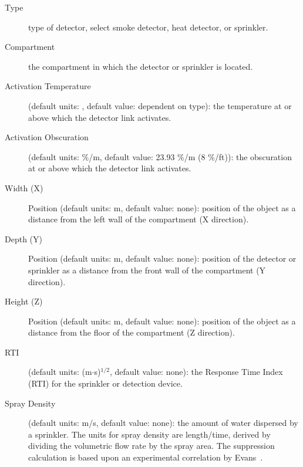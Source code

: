 \begin{description}
\item[Type] type of detector, select smoke detector, heat detector, or sprinkler.

\item[Compartment] the compartment in which the detector or sprinkler is located.

\item[Activation Temperature] (default units: \degc, default value: dependent on type): the temperature at or above which the detector link activates.

\item[Activation Obscuration] (default units: \%/m, default value: 23.93 \%/m (8 \%/ft)): the obscuration at or above which the detector link activates.

\item[Width (X)] Position (default units: m, default value: none): position of the object as a distance from the left wall of the compartment (X direction).

\item[Depth (Y)] Position (default units: m, default value: none): position of the detector or sprinkler as a distance from the front wall of the compartment (Y direction).

\item[Height (Z)] Position (default units: m, default value: none): position of the object as a distance from the floor of the compartment (Z direction).

\item[RTI] (default units: (m$\cdot$s)$^{1/2}$, default value: none): the Response Time Index (RTI) for the sprinkler or detection device.

\item[Spray Density] (default units: m/s, default value: none): the amount of water dispersed by a sprinkler.  The units for spray density are length/time, derived by dividing the volumetric flow rate by the spray area. The suppression calculation is based upon an experimental correlation by Evans~\cite{Evans:1993}.
\end{description}

